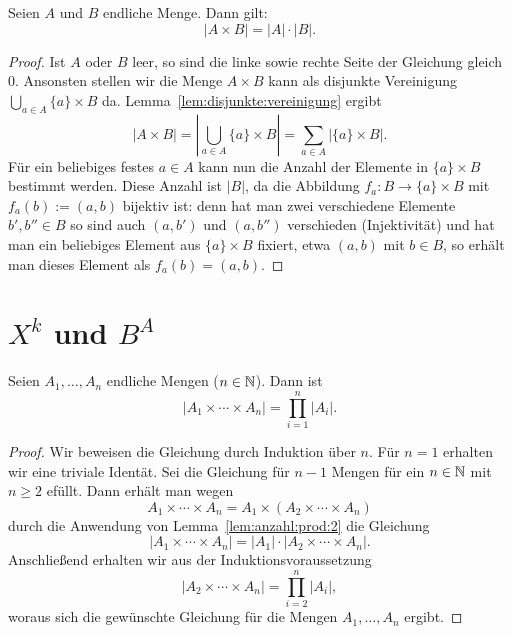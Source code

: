 \begin{lem} \label{lem:anzahl:prod:2}
	Seien $A$ und $B$ endliche Menge. Dann gilt: 
	\[
		|A \times B| = |A| \cdot |B|. 
	\]
\end{lem}
\begin{proof} 
	Ist $A$ oder $B$ leer, so sind die linke sowie rechte Seite der Gleichung gleich $0$. Ansonsten stellen wir die Menge $A \times B$ kann als disjunkte Vereinigung $\bigcup_{a \in A} \{a\} \times B$ da. Lemma~\ref{lem:disjunkte:vereinigung} ergibt
	\[
		|A \times B| = \left| \bigcup_{a \in A} \{a \} \times B \right| = \sum_{a \in A} | \{a \} \times B |.
	\]
	Für ein beliebiges festes $a \in A$ kann nun die Anzahl der Elemente in $\{a\} \times B$ bestimmt werden. Diese Anzahl ist $|B|$, da die Abbildung $f_a : B \to \{a\} \times B$ mit $f_a(b) := (a,b)$ bijektiv ist: denn hat man zwei verschiedene Elemente $b',b'' \in B$ so sind auch $(a,b')$ und $(a,b'')$ verschieden (Injektivität) und hat man ein beliebiges Element aus $\{a\} \times B$ fixiert, etwa $(a,b)$ mit $b \in B$, so erhält man dieses Element als $f_a(b) = (a,b)$. 
\end{proof} 
 

\section{$X^k$ und $B^A$} 

\begin{thm}
	Seien $A_1,\ldots, A_n$ endliche Mengen ($n \in \mathbb{N}$). Dann ist 
	\[
		|A_1 \times \cdots \times A_n|  = \prod_{i=1}^n |A_i|. 
	\]
\end{thm} 
\begin{proof}
	Wir beweisen die Gleichung durch Induktion über $n$.
	Für $n=1$ erhalten wir eine triviale Identät. Sei die Gleichung für $n-1$ Mengen für ein $n \in \mathbb{N}$ mit $n \ge 2$ efüllt. Dann erhält man wegen 
	\[
			A_1 \times \cdots \times A_n = A_1 \times (A_2 \times \cdots \times A_n)
	\]
	durch die Anwendung von Lemma~\ref{lem:anzahl:prod:2} die Gleichung 
	\[
		|A_1 \times \cdots \times A_n | = |A_1| \cdot |A_2 \times \cdots \times A_n|. 
	\]
	Anschließend erhalten wir aus der Induktionsvoraussetzung 
	\[
		|A_2 \times \cdots \times A_n| = \prod_{i=2}^n |A_i|,
	\]
	woraus sich die gewünschte Gleichung für die Mengen $A_1,\ldots,A_n$ ergibt. 
\end{proof} 

